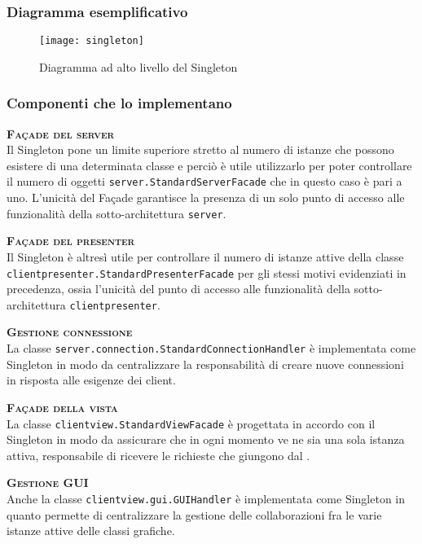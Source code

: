 \subsubsection{Diagramma esemplificativo}
\begin{figure}[H]
\centering
\texttt{[image: singleton]}
\caption{Diagramma ad alto livello del  Singleton}\label{fig:singleton}
\end{figure}

\subsubsection{Componenti che lo implementano}
\begin{description}
  \item{\scshape\bfseries Façade del server}\\
Il  Singleton pone un limite superiore stretto al numero di istanze che possono esistere di una determinata classe e perciò è utile utilizzarlo per poter controllare il numero di oggetti \texttt{server.StandardServerFacade} che in questo caso è pari a uno. L'unicità del Façade garantisce la presenza di un solo punto di accesso alle funzionalità della sotto-architettura \texttt{server}.
  \item{\scshape\bfseries Façade del presenter}\\
Il  Singleton è altresì utile per controllare il numero di istanze attive della classe \texttt{clientpresenter.StandardPresenterFacade} per gli stessi motivi evidenziati in precedenza, ossia l'unicità del punto di accesso alle funzionalità della sotto-architettura \texttt{clientpresenter}.
  \item{\scshape\bfseries Gestione connessione}\\
La classe \texttt{server.connection.StandardConnectionHandler} è implementata come Singleton in modo da centralizzare la responsabilità di creare nuove connessioni in risposta alle esigenze dei client.
  \item{\scshape\bfseries Façade della vista}\\
La classe \texttt{clientview.StandardViewFacade} è progettata in accordo con il  Singleton in modo da assicurare che in ogni momento ve ne sia una sola istanza attiva, responsabile di ricevere le richieste che giungono dal .
  \item{\scshape\bfseries Gestione GUI}\\
Anche la classe \texttt{clientview.gui.GUIHandler} è implementata come Singleton in quanto permette di centralizzare la gestione delle collaborazioni fra le varie istanze attive delle classi grafiche.
\end{description}

